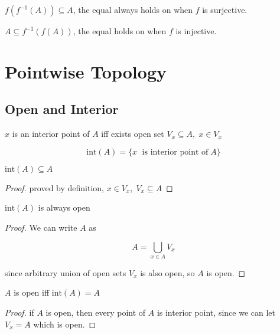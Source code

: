 \documentclass[11pt,a4paper]{article}
\begin{document}
\begin{lem}
    $f(f^{-1}(A)) \subseteq A$, the equal always holds on when $f$ is surjective.
\end{lem}


\begin{lem}
    $A \subseteq f^{-1}(f(A))$, the equal holds on when $f$ is injective.
\end{lem}

\section{Pointwise Topology}

\subsection{Open and Interior}

\begin{definition}
    $x$ is an interior point of $A$ iff exists open set $V_x \subseteq A,\; x \in V_x$ 
\end{definition}


\begin{definition}
    \[
        \text{int}(A) = \{ x \;\text{ is interior point of}\; A \}
    \]
\end{definition}

\begin{lem}
    $\text{int}(A) \subseteq A$
\end{lem}

\begin{proof}
    proved by definition, $x \in V_x,\; V_x \subseteq A$
\end{proof}


\begin{lem}
    $\text{int}(A)$ is always open 
\end{lem}

\begin{proof}
    We can write $A$ as

    \[
        A = \bigcup_{x \in A}V_x
    \]

    since arbitrary union of open sets $V_x$ is also open, so $A$ is open.
\end{proof}

\begin{lem}
    $A$ is open iff $\text{int}(A) = A$
\end{lem}

\begin{proof}
    if $A$ is open, then every point of $A$ is interior point, since we can let $V_x = A$ which is open.
\end{proof}
\end{document}
